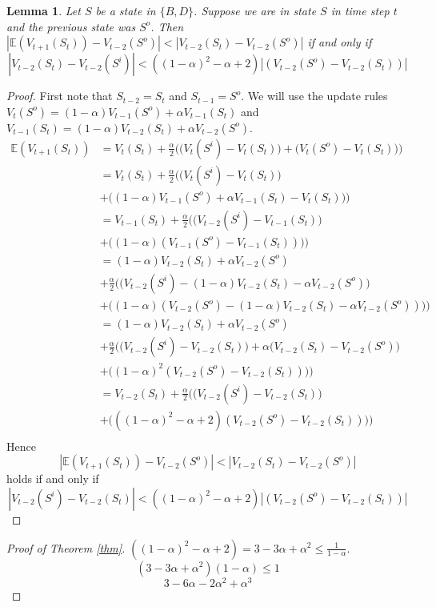 \documentclass[12pt,a4paper]{article}
\newtheorem{lemma}{Lemma}
\begin{document}
\begin{enumerate}
\begin{lemma}
  Let $S$ be a state in $\{B, D\}$. Suppose we are in state $S$ in
  time step $t$ and the previous state was $S^o$. Then
  $|\mathbb{E}(V_{t + 1}(S_t)) - V_{t - 2}(S^o)| < |V_{t - 2}(S_t) - V_{t - 2}(S^o)|$
  if and only if
  \[
  |V_{t - 2}(S_t) - V_{t - 2}(S^i)| <
  ((1 - \alpha)^2 - \alpha + 2)|(V_{t - 2}(S^o) - V_{t - 2}(S_t))|
  \]
\end{lemma}
\begin{proof}
  First note that $S_{t - 2} = S_t$ and $S_{t - 1} = S^o$. We will use the update rules
  $V_t(S^o) = (1 - \alpha) V_{t - 1}(S^o) + \alpha V_{t - 1}(S_t)$ and
  $V_{t - 1}(S_t) = (1 - \alpha) V_{t - 2}(S_t) + \alpha V_{t - 2}(S^o)$.
  \begin{align*}
  \mathbb{E}(V_{t + 1}(S_t))
%
  & = V_t(S_t) + \frac{\alpha}{2} \Big(\big(V_t(S^i) - V_t(S_t)\big) + \big(V_t(S^o) - V_t(S_t)\big)\Big)\\
%
  & = V_t(S_t) + \frac{\alpha}{2} \Big(\big(V_t(S^i) - V_t(S_t)\big)\\
  & + \big((1 - \alpha) V_{t - 1}(S^o) + \alpha V_{t - 1}(S_t) - V_t(S_t)\big)\Big)\\
%
  & = V_{t - 1}(S_t) + \frac{\alpha}{2} \Big(\big(V_{t - 2}(S^i) - V_{t - 1}(S_t)\big)\\
  & + \big((1 - \alpha) (V_{t - 1}(S^o) - V_{t - 1}(S_t))\big)\Big)\\
%
  & = (1 - \alpha) V_{t - 2}(S_t) + \alpha V_{t - 2}(S^o) \\
  & + \frac{\alpha}{2} \Big(\big(V_{t - 2}(S^i)
  - (1 - \alpha) V_{t - 2}(S_t) - \alpha V_{t - 2}(S^o)\big) \\
  & + \big((1 - \alpha)(V_{t - 2}(S^o)
  - (1 - \alpha) V_{t - 2}(S_t) - \alpha V_{t - 2}(S^o))\big)\Big)\\
%
  & = (1 - \alpha) V_{t - 2}(S_t) + \alpha V_{t - 2}(S^o) \\
  & + \frac{\alpha}{2} \Big(\big(V_{t - 2}(S^i) - V_{t - 2}(S_t)\big)
  + \alpha\big(V_{t - 2}(S_t) - V_{t - 2}(S^o)\big)\\
  & + \big((1 - \alpha)^2(V_{t - 2}(S^o) - V_{t - 2}(S_t))\big)\Big)\\
%
& = V_{t - 2}(S_t) + \frac{\alpha}{2} \Big(\big(V_{t - 2}(S^i) - V_{t - 2}(S_t)\big)\\
& + \big(((1 - \alpha)^2 - \alpha + 2)(V_{t - 2}(S^o) - V_{t - 2}(S_t))\big)\Big)\\
%
  \end{align*}
  Hence
  \[|\mathbb{E}(V_{t + 1}(S_t)) - V_{t - 2}(S^o)| < |V_{t - 2}(S_t) - V_{t - 2}(S^o)|\]
  holds if and only if
  \[|V_{t - 2}(S^i) - V_{t - 2}(S_t)|
  < ((1 - \alpha)^2 - \alpha + 2)|(V_{t - 2}(S^o) - V_{t - 2}(S_t))|
  \]
\end{proof}

\begin{proof}[Proof of Theorem \ref{thm}]
  $((1 - \alpha)^2 - \alpha + 2) = 3 - 3\alpha + \alpha^2 \le \frac{1}{1 - \alpha}$.
  \[(3 - 3\alpha + \alpha^2)(1 - \alpha) \le 1\]
  \[3 - 6\alpha - 2\alpha^2 + \alpha^3\]

\end{proof}

\end{enumerate}
\end{document}
